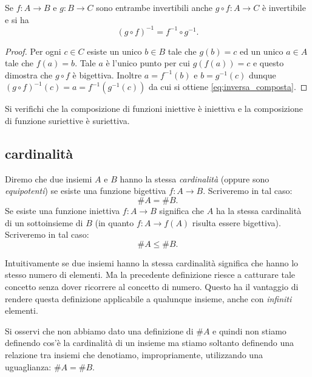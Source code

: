 \begin{theorem}
Se $f\colon A\to B$ e $g\colon B\to C$ sono entrambe invertibili
anche $g\circ f\colon A\to C$ è invertibile e si ha 
\begin{equation}\label{eq:inversa_composta}
  (g\circ f)^{-1} = f^{-1}\circ g^{-1}.
\end{equation}
\end{theorem}
\begin{proof}    
Per ogni $c\in C$ esiste un unico $b\in B$ tale che $g(b)=c$ 
ed un unico $a\in A$ tale che $f(a)=b$. 
Tale $a$ è l'unico punto per cui $g(f(a))=c$ e questo dimostra che 
$g\circ f$ è bigettiva. Inoltre $a=f^{-1}(b)$ e $b=g^{-1}(c)$ 
dunque $(g\circ f)^{-1}(c) = a = f^{-1}(g^{-1}(c))$ da cui si ottiene 
\eqref{eq:inversa_composta}.
\end{proof}

\begin{exercise}
  Si verifichi che la composizione di funzioni iniettive è iniettiva e la composizione 
  di funzione suriettive è suriettiva.
\end{exercise}

\subsection{cardinalità}

\begin{definition}[cardinalità]
  Diremo che due insiemi $A$ e $B$ hanno la stessa \emph{cardinalità}%
%
  (oppure sono \emph{equipotenti}) 
  se esiste una funzione bigettiva $f\colon A \to B$.
  Scriveremo in tal caso:
  \[
    \# A = \# B.  
  \] 
  Se esiste una funzione iniettiva $f\colon A\to B$ significa che 
  $A$ ha la stessa cardinalità di un sottoinsieme di $B$ (in quanto $f\colon A \to f(A)$
  risulta essere bigettiva). Scriveremo in tal caso:
  \[
    \# A \le \#B.
  \]
\end{definition}

Intuitivamente se due insiemi hanno la stessa cardinalità 
significa che hanno lo stesso numero di elementi.
Ma la precedente definizione riesce a catturare tale concetto senza dover 
ricorrere al concetto di numero. 
Questo ha il vantaggio di rendere questa definizione applicabile 
a qualunque insieme, anche con \emph{infiniti} elementi.

Si osservi che non abbiamo dato una definizione di $\#A$ e quindi non stiamo 
definendo cos'è la cardinalità di un insieme ma stiamo soltanto definendo 
una relazione tra insiemi che 
denotiamo, impropriamente, utilizzando una uguaglianza: $\#A = \#B$.

